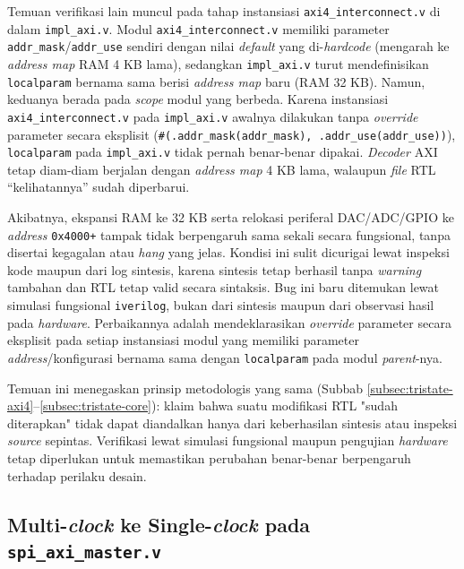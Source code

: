 Temuan verifikasi lain muncul pada tahap instansiasi \texttt{axi4\_interconnect.v} di dalam \texttt{impl\_axi.v}. Modul \texttt{axi4\_interconnect.v} memiliki parameter \texttt{addr\_mask}/\texttt{addr\_use} sendiri dengan nilai \textit{default} yang di-\textit{hardcode} (mengarah ke \textit{address map} RAM 4 KB lama), sedangkan \texttt{impl\_axi.v} turut mendefinisikan \texttt{localparam} bernama sama berisi \textit{address map} baru (RAM 32 KB). Namun, keduanya berada pada \textit{scope} modul yang berbeda. Karena instansiasi \texttt{axi4\_interconnect.v} pada \texttt{impl\_axi.v} awalnya dilakukan tanpa \textit{override} parameter secara eksplisit (\texttt{\#(.addr\_mask(addr\_mask), .addr\_use(addr\_use))}), \texttt{localparam} pada \texttt{impl\_axi.v} tidak pernah benar-benar dipakai. \textit{Decoder} AXI tetap diam-diam berjalan dengan \textit{address map} 4 KB lama, walaupun \textit{file} RTL ``kelihatannya'' sudah diperbarui.

Akibatnya, ekspansi RAM ke 32 KB serta relokasi periferal DAC/ADC/GPIO ke \textit{address} \texttt{0x4000+} tampak tidak berpengaruh sama sekali secara fungsional, tanpa disertai kegagalan atau \textit{hang} yang jelas. Kondisi ini sulit dicurigai lewat inspeksi kode maupun dari log sintesis, karena sintesis tetap berhasil tanpa \textit{warning} tambahan dan RTL tetap valid secara sintaksis. Bug ini baru ditemukan lewat simulasi fungsional \texttt{iverilog}, bukan dari sintesis maupun dari observasi hasil pada \textit{hardware}. Perbaikannya adalah mendeklarasikan \textit{override} parameter secara eksplisit pada setiap instansiasi modul yang memiliki parameter \textit{address}/konfigurasi bernama sama dengan \texttt{localparam} pada modul \textit{parent}-nya.

Temuan ini menegaskan prinsip metodologis yang sama (Subbab \ref{subsec:tristate-axi4}--\ref{subsec:tristate-core}): klaim bahwa suatu modifikasi RTL "sudah diterapkan" tidak dapat diandalkan hanya dari keberhasilan sintesis atau inspeksi \textit{source} sepintas. Verifikasi lewat simulasi fungsional maupun pengujian \textit{hardware} tetap diperlukan untuk memastikan perubahan benar-benar berpengaruh terhadap perilaku desain.

\subsection{Multi-\textit{clock} ke Single-\textit{clock} pada \texttt{spi\_axi\_master.v}}
\label{subsec:multiclock}

